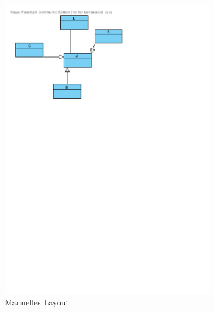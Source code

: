 \begin{figure}[hbt]
    \newcommand{\leftsubfigurewidth}{0.4\textwidth}
    \newcommand{\rightsubfigurewidth}{0.59\textwidth}
    \newcommand{\graphicsscale}{0.58}
    \centering
    \begin{subfigure}{\leftsubfigurewidth}
        \centering
        \includegraphics[scale=\graphicsscale]{resources/visual-paradigm-auto-layout-a}
        \caption{Manuelles Layout}
        \label{fig:visual-paradigm-auto-layout-a}
    \end{subfigure}
    \begin{subfigure}{\rightsubfigurewidth}
        \centering

\end{subfigure}
\end{figure}
